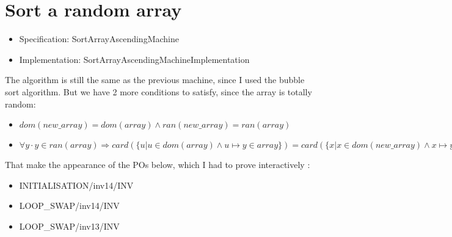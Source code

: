 \section{Sort a random array}

\begin{itemize}
\item Specification: SortArrayAscendingMachine
\item Implementation: SortArrayAscendingMachineImplementation
\end{itemize}
The algorithm is still the same as the previous machine, since I used the bubble sort algorithm. 
But we have 2 more conditions to satisfy, since the array is totally random: 
\begin{itemize}
\item $dom(new\_array) = dom(array) \land ran(new\_array) = ran(array)$
\item $\forall y \cdot y \in ran(array) \Rightarrow card(\{u | u \in dom(array) \land u \mapsto y \in array\}) = card(\{x | x \in dom(new\_array) \land x \mapsto y \in new_array\})$
\end{itemize}

That make the appearance of the POs below, which I had to prove interactively :
\begin{itemize}
\item INITIALISATION/inv14/INV
\item LOOP\_SWAP/inv14/INV
\item LOOP\_SWAP/inv13/INV
\end{itemize}


